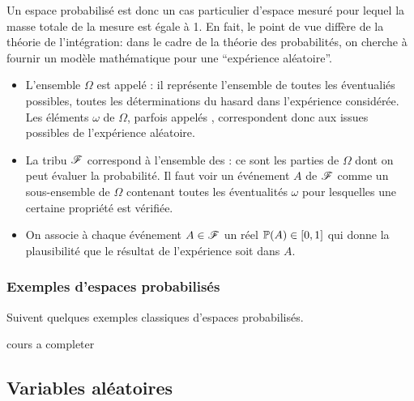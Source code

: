 \begin{interp}
    Un espace probabilisé est donc un cas particulier d'espace mesuré
    pour lequel la masse totale de la mesure est égale à 1. En fait,
    le point de vue diffère de la théorie de l'intégration: dans
    le cadre de la théorie des probabilités, on cherche à fournir
    un modèle mathématique pour une ``expérience aléatoire''.

    \begin{itemize}
        \item L'ensemble \(\Omega\) est appelé :
        il représente l'ensemble de toutes les éventualiés possibles,
        toutes les déterminations du hasard dans l'expérience considérée.
        Les éléments \(\omega\) de \(\Omega\), parfois appelés
        , correspondent donc aux issues
        possibles de l'expérience aléatoire.

        \item La tribu \(\mathscr{F}\) correspond à l'ensemble des
        :  ce sont les parties de \(\Omega\) dont
        on peut évaluer la probabilité. Il faut voir un événement
        \(A\) de \(\mathscr{F}\) comme un sous-ensemble de \(\Omega\) 
        contenant toutes les éventualités \(\omega\) pour
        lesquelles une certaine propriété est vérifiée.

        \item On associe à chaque événement \(A\in\mathscr{F}\) un réel
        \(\mathbb{P}(A) \in \mathopen{}\left[0,1\right]\mathclose{}\) qui donne la plausibilité que
        le résultat de l'expérience soit dans \(A\).
    \end{itemize}
\end{interp}

\subsubsection{Exemples d'espaces probabilisés}\label{subsubsec:1-2}
\setcounter{subsection}{0}
Suivent quelques exemples classiques d'espaces probabilisés.

\begin{exs}[]
    cours a completer
\end{exs}


\subsection{Variables aléatoires}\label{subsec:2}

